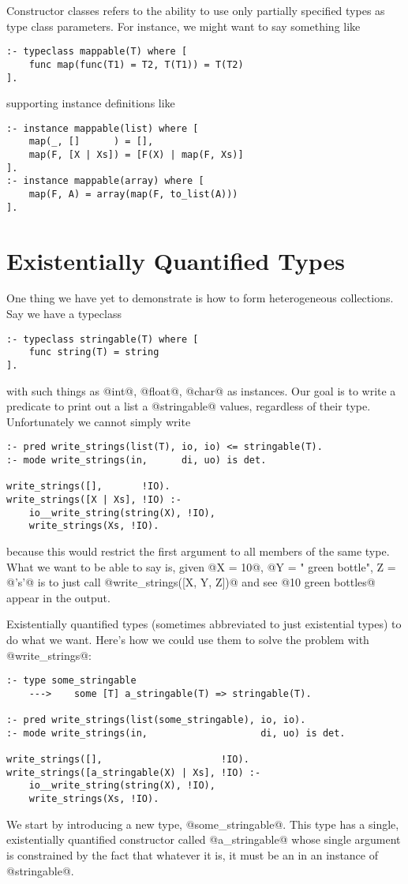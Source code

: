 Constructor classes refers to the ability to use only partially
specified types as type class parameters.  For instance, we might want
to say something like
\begin{verbatim}
:- typeclass mappable(T) where [
    func map(func(T1) = T2, T(T1)) = T(T2)
].
\end{verbatim}
supporting instance definitions like
\begin{verbatim}
:- instance mappable(list) where [
    map(_, []      ) = [],
    map(F, [X | Xs]) = [F(X) | map(F, Xs)]
].
:- instance mappable(array) where [
    map(F, A) = array(map(F, to_list(A)))
].
\end{verbatim}


\section{Existentially Quantified Types}

One thing we have yet to demonstrate is how to form heterogeneous
collections.  Say we have a typeclass
\begin{verbatim}
:- typeclass stringable(T) where [
    func string(T) = string
].
\end{verbatim}
with such things as @int@, @float@, @char@ as instances.  Our goal is to
write a predicate to print out a list a @stringable@ values, regardless
of their type.  Unfortunately we cannot simply write
\begin{verbatim}
:- pred write_strings(list(T), io, io) <= stringable(T).
:- mode write_strings(in,      di, uo) is det.

write_strings([],       !IO).
write_strings([X | Xs], !IO) :-
    io__write_string(string(X), !IO),
    write_strings(Xs, !IO).
\end{verbatim}
because this would restrict the first argument to all members of the
same type.  What we want to be able to say is, given @X = 10@,
@Y = " green bottle", Z = @'s'@ is to just call
@write_strings([X, Y, Z])@ and see @10 green bottles@ appear in the
output.

Existentially quantified types (sometimes abbreviated to just
existential types) to do what we want.  Here's how we could use them to
solve the problem with @write_strings@:
\begin{verbatim}
:- type some_stringable
    --->    some [T] a_stringable(T) => stringable(T).

:- pred write_strings(list(some_stringable), io, io).
:- mode write_strings(in,                    di, uo) is det.

write_strings([],                     !IO).
write_strings([a_stringable(X) | Xs], !IO) :-
    io__write_string(string(X), !IO),
    write_strings(Xs, !IO).
\end{verbatim}
We start by introducing a new type, @some_stringable@.  This type has a 
single, existentially quantified constructor called @a_stringable@ whose
single argument is constrained by the fact that whatever it is, it must
be an in an instance of @stringable@.

